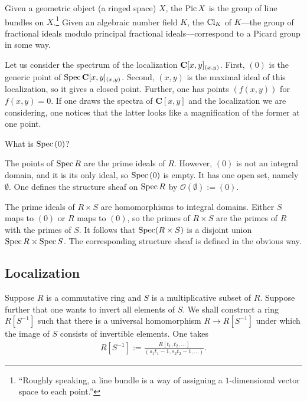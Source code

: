 \documentclass [11 pt, oneside, margin = 1 in] {article}
\begin{document}
\begin{remark}
	Given a geometric object (a ringed space) $X$, the  $\operatorname{Pic} X$ is the group of line bundles on $X$.\footnote{``Roughly speaking, a line bundle is a way of assigning a $1$-dimensional vector space to each point.''} Given an algebraic number field $K$, the  $\operatorname{Cl}_K$ of $K$---the group of fractional ideals modulo principal fractional ideals---correspond to a Picard group in some way.
\end{remark}

\begin{example}[ ]\label{}\text{}
Let us consider the spectrum of the localization $\mathbf C[x,y]_{(x,y)}$. First, $(0)$ is the generic point of $\operatorname{Spec} \mathbf C[x,y]_{(x,y)}$. Second, $(x,y)$ is the maximal ideal of this localization, so it gives a closed point. Further, one has points $(f(x,y))$ for $f(x,y)=0$. If one draws the spectra of $\mathbf{C}[x,y]$ and the localization we are considering, one notices that the latter looks like a magnification of the former at one point.
\end{example}

\begin{problem}
	What is $\operatorname{Spec} \text{}(0)$?
\end{problem}

The points of $\operatorname{Spec} R$ are the prime ideals of $R$. However, $(0)$ is not an integral domain, and it is its only ideal, so $\operatorname{Spec} \text{}(0)$ is empty. It has one open set, namely $\emptyset$. One defines the structure sheaf on $\operatorname{Spec} R$ by $\mathscr{O}(\emptyset) :=  (0)$.

\begin{example}
	The prime ideals of $R\times S$ are homomorphisms to integral domains. Either $S$ maps to $(0)$ or $R$ maps to $(0)$, so the primes of $R\times S$ are the primes of $R$ with the primes of $S$. It follows that $\operatorname{Spec} (R\times S)$ is a disjoint union $\operatorname{Spec} R\times \operatorname{Spec} S$. The corresponding structure sheaf is defined in the obvious way.
\end{example}

\subsection{Localization}
Suppose $R$ is a commutative ring and $S$ is a multiplicative subset of $R$. Suppose further that one wants to invert all elements of $S$. We shall construct a ring $R[S^{-1}]$ such that there is a universal homomorphism $R\longrightarrow R[S^{-1}]$ under which the image of $S$ consists of invertible elements. One takes
\begin{align*}
	R[S^{-1}] := \frac{R[t_1,t_2,\hdots]}{(s_1t_1-1,s_2t_2-1,\hdots)}.
\end{align*}
\end{document}
